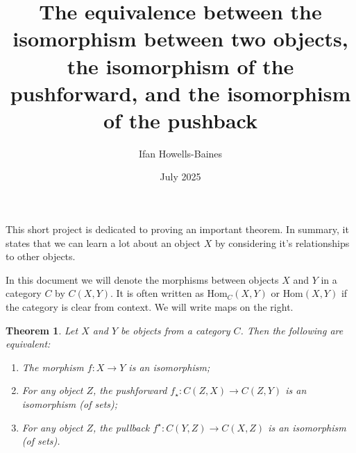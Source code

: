 \documentclass[12pt]{article}
\title{The equivalence between the isomorphism between two objects, the isomorphism of the pushforward, and the isomorphism of the pushback}
\author{Ifan Howells-Baines}
\date{July 2025}
\theoremstyle{theorem}
\newtheorem*{theorem}{Theorem}
\begin{document}
\maketitle

This short project is dedicated to proving an important theorem. In summary, it states that we can learn a lot about an object $X$ by considering it's relationships to other objects.

In this document we will denote the morphisms between objects $X$ and $Y$ in a category $C$ by $C(X,Y)$. It is often written as $\textrm{Hom}_C(X,Y)$ or $\textrm{Hom}(X,Y)$ if the category is clear from context. We will write maps on the right.

\begin{theorem}
  Let $X$ and $Y$ be objects from a category $C$. Then the following are equivalent:
  \begin{enumerate}
  \item The morphism $f:X\to Y$ is an isomorphism;
  \item For any object $Z$, the pushforward $f_\star :C(Z,X)\to C(Z,Y)$ is an isomorphism (of sets);
  \item For any object $Z$, the pullback $f^\star :C(Y,Z)\to C(X,Z)$ is an isomorphism (of sets).
  \end{enumerate}
\end{theorem}
\end{document}
